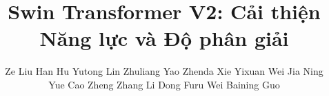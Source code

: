 \documentclass[times, twocolumn]{zHenriquesLab-StyleBioRxiv}
\begin{document}
\title{Swin Transformer V2: Cải thiện Năng lực và Độ phân giải}

\author{Ze Liu \hspace{5pt} Han Hu \hspace{5pt} Yutong Lin \hspace{5pt} Zhuliang Yao \hspace{5pt} Zhenda Xie \hspace{5pt} Yixuan Wei \hspace{5pt} Jia Ning \\ Yue Cao \hspace{5pt} Zheng Zhang \hspace{5pt} Li Dong \hspace{5pt} Furu Wei \hspace{5pt} Baining Guo}


\maketitle
\end{document}
